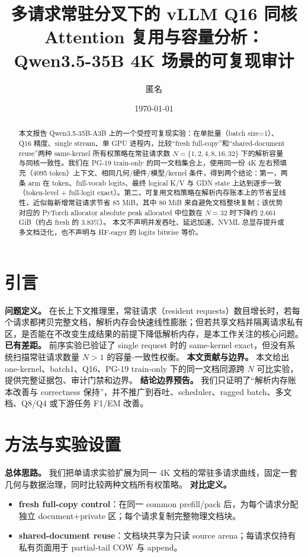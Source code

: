 \documentclass[11pt]{article}
\title{多请求常驻分叉下的 vLLM Q16 同核 Attention 复用与容量分析：\\
Qwen3.5-35B 4K 场景的可复现审计}
\author{匿名}
\date{\today}
\begin{document}
\maketitle

\begin{abstract}
本文报告 Qwen3.5-35B-A3B 上的一个受控可复现实验：在单批量（batch size=1）、Q16 精度、single stream、单 GPU 进程内，比较“fresh full-copy”和“shared-document reuse”两种 same-kernel 所有权策略在常驻请求数
$N=\{1,2,4,8,16,32\}$ 下的解析容量与同核一致性。我们在 PG-19 train-only 的同一文档集合上，使用同一份 4K 左右预填充（4095 token）上下文、相同几何/硬件/模型/kernel 条件，得到两个结论：第一，两条 arm 在 token、full-vocab logits、最终 logical K/V 与 GDN state 上达到逐步一致（token-level + full-logit exact）。第二，可复用文档策略在解析内存账本上的节省呈线性，近似每新增常驻请求节省 85 MiB，其中 80 MiB 来自避免文档整块复制；该优势对应的 PyTorch allocator absolute peak allocated 中位数在 $N=32$ 时下降约 2.661 GiB（约占 fresh 的 3.83\%）。  
本文不声明并发吞吐、延迟加速、NVML 总显存提升或多文档泛化，也不声明与 HF-eager 的 logits bitwise 等价。
\end{abstract}

\section{引言}
\textbf{问题定义。} 在长上下文推理里，常驻请求（resident requests）数目增长时，若每个请求都拷贝完整文档，解析内存会快速线性膨胀；但若共享文档并隔离请求私有区，是否能在不改变生成结果的前提下降低解析内存，是本工作关注的核心问题。  
\textbf{已有差距。} 前序实验已验证了 single request 时的 same-kernel exact，但没有系统扫描常驻请求数量 $N>1$ 的容量-一致性权衡。  
\textbf{本文贡献与边界。} 本文给出 one-kernel、batch1、Q16、PG-19 train-only 下的同一文档同源跨 $N$ 可比实验，提供完整证据包、审计门禁和边界。  
\textbf{结论边界预告。} 我们只证明了“解析内存账本改善与 correctness 保持”，并不推广到吞吐、scheduler、ragged batch、多文档、Q8/Q4 或下游任务 F1/EM 改善。

\section{方法与实验设置}
\textbf{总体思路。} 我们把单请求实验扩展为同一 4K 文档的常驻多请求曲线，固定一套几何与数据治理，同时比较两种文档所有权策略。  
\textbf{对比定义。}
\begin{itemize}
  \item \textbf{fresh full-copy control}：在同一 common prefill/pack 后，为每个请求分配独立 document+private 区；每个请求复制完整物理文档块。  
  \item \textbf{shared-document reuse}：文档块共享为只读 source arena；每请求仅持有私有页面用于 partial-tail COW 与 append。  
\end{itemize}
\end{document}
